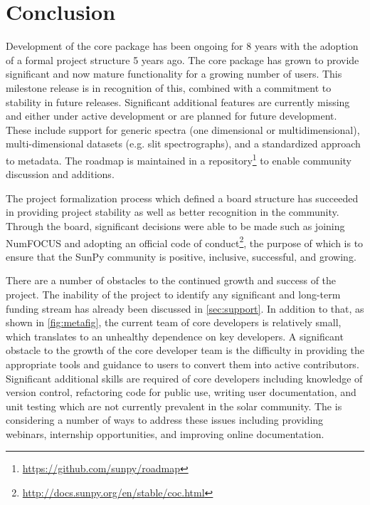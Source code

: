 \section{Conclusion}
\label{sec:conclusion}

Development of the \sunpypkg core package has been ongoing for 8 years with the adoption of a formal project structure 5 years ago.
The core package has grown to provide significant and now mature functionality for a growing number of users.
This milestone release is in recognition of this, combined with a commitment to stability in future releases.
Significant additional features are currently missing and either under active development or are planned for future development.
These include support for generic spectra (one dimensional or multidimensional), multi-dimensional datasets (e.g. slit spectrographs), and a standardized approach to metadata. The roadmap is maintained in a repository\footnote{\url{https://github.com/sunpy/roadmap}} to enable community discussion and additions.

The project formalization process which defined a board structure has succeeded in providing project stability as well as better recognition in the community.
Through the board, significant decisions were able to be made such as joining NumFOCUS and adopting an official code of conduct\footnote{\url{http://docs.sunpy.org/en/stable/coc.html}}, the purpose of which is to ensure that the SunPy community is positive, inclusive, successful, and growing.

There are a number of obstacles to the continued growth and success of the project. The inability of the project to identify any significant and long-term funding stream has already been discussed in \autoref{sec:support}.
In addition to that, as shown in \autoref{fig:metafig}, the current team of core developers is relatively small, which translates to an unhealthy dependence on key developers.
A significant obstacle to the growth of the core developer team is the difficulty in providing the appropriate tools and guidance to users to convert them into active contributors.
Significant additional skills are required of core developers including knowledge of version control, refactoring code for public use, writing user documentation, and unit testing which are not currently prevalent in the solar community.
The \sunpyproj is considering a number of ways to address these issues including providing webinars, internship opportunities, and improving online documentation.

